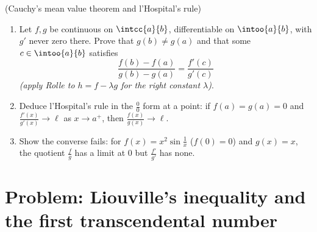 \begin{exercise}[$\star\star\star$]\label{exo:b1:derivative:12}
(Cauchy's mean value theorem and l'Hospital's rule)
\begin{enumerate}
  \item Let $f, g$ be continuous on $\intcc{a}{b}$,
        differentiable on $\intoo{a}{b}$, with $g'$ never zero
        there. Prove that $g(b) \neq g(a)$ and that some $c \in
        \intoo{a}{b}$ satisfies
        \[
        \frac{f(b) - f(a)}{g(b) - g(a)} = \frac{f'(c)}{g'(c)}
        \]
        \emph{(apply Rolle to $h = f - \lambda g$ for the right
        constant $\lambda$)}.
  \item Deduce l'Hospital's rule in the $\frac00$ form at a
        point: if $f(a) = g(a) = 0$ and
        $\frac{f'(x)}{g'(x)} \to \ell$ as $x \to a^+$, then
        $\frac{f(x)}{g(x)} \to \ell$.
  \item Show the converse fails: for $f(x) = x^2\sin\frac1x$
        ($f(0) = 0$) and $g(x) = x$, the quotient
        $\frac{f}{g}$ has a limit at $0$ but
        $\frac{f'}{g'}$ has none.
\end{enumerate}
\end{exercise}

\section{Problem: Liouville's inequality and the first
transcendental number}

